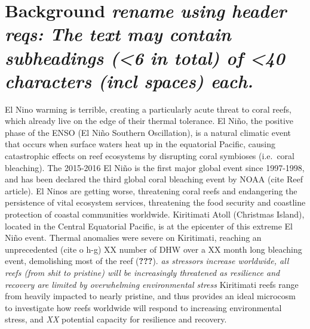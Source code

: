 \documentclass[]{article}
\begin{document}
\section{\texorpdfstring{Background \emph{rename using header reqs: The
text may contain subheadings (\textless{}6 in total) of \textless{}40
characters (incl spaces)
each.}}{Background rename using header reqs: The text may contain subheadings (\textless{}6 in total) of \textless{}40 characters (incl spaces) each.}}\label{background-rename-using-header-reqs-the-text-may-contain-subheadings-6-in-total-of-40-characters-incl-spaces-each.}

El Nino warming is terrible, creating a particularly acute threat to
coral reefs, which already live on the edge of their thermal tolerance.
El Niño, the positive phase of the ENSO (El Niño Southern Oscillation),
is a natural climatic event that occurs when surface waters heat up in
the equatorial Pacific, causing catastrophic effects on reef ecosystems
by disrupting coral symbioses (i.e.~coral bleaching). The 2015-2016 El
Niño is the first major global event since 1997-1998, and has been
declared the third global coral bleaching event by NOAA (cite Reef
article). El Ninos are getting worse, threatening coral reefs and
endangering the persistence of vital ecosystem services, threatening the
food security and coastline protection of coastal communities worldwide.
Kiritimati Atoll (Christmas Island), located in the Central Equatorial
Pacific, is at the epicenter of this extreme El Niño event. Thermal
anomalies were severe on Kiritimati, reaching an unprecedented (cite o
h-g) XX number of DHW over a XX month long bleaching event, demolishing
most of the reef (\textbf{???}). \emph{as stressors increase worldwide,
all reefs (from shit to pristine) will be increasingly threatened as
resilience and recovery are limited by overwhelming environmental
stress} Kiritimati reefs range from heavily impacted to nearly pristine,
and thus provides an ideal microcosm to investigate how reefs worldwide
will respond to increasing environmental stress, and \emph{XX} potential
capacity for resilience and recovery.
\end{document}

